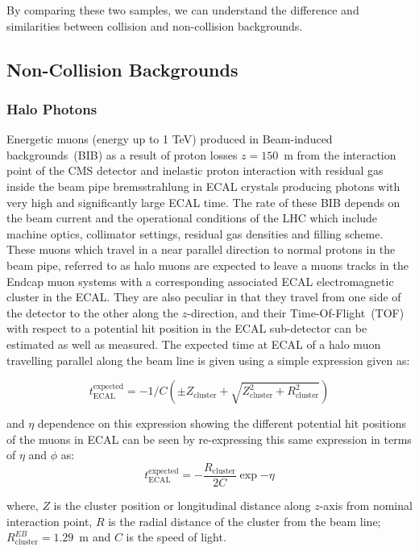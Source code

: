 By comparing these two samples, we can understand the difference and similarities between collision and non-collision backgrounds. 

\subsection{Non-Collision Backgrounds}
\subsubsection{Halo Photons}
Energetic muons (energy up to 1 TeV) produced in Beam-induced backgrounds~(BIB) as a result of proton losses $z = 150$~m from the interaction point of the CMS detector and inelastic proton interaction with residual gas inside the beam pipe bremsstrahlung in ECAL crystals producing photons with very high \pt and significantly large ECAL time. The rate of these BIB depends on the beam current and the operational conditions of the LHC which include machine optics, collimator settings, residual gas densities and filling scheme. These muons which travel in a near parallel direction to normal protons in the beam pipe, referred to as halo muons are expected to leave a muons tracks  in the Endcap muon systems with a corresponding associated ECAL electromagnetic cluster in the ECAL. They are also peculiar in that they travel from one side of the detector to the other along the $z$-direction, and their  Time-Of-Flight~(TOF) with respect to a potential hit position in the ECAL sub-detector can be estimated as well as measured.
The expected time at ECAL of a  halo muon travelling parallel along the beam line is given using a simple expression given as:

\begin{equation}
t^{\mbox{expected}}_{\mbox{ECAL}} = -1/C\left( \pm Z_{\mbox{cluster}} + \sqrt{Z^{2}_{\mbox{cluster}} + R^{2}_{\mbox{cluster}}}  \right)
\end{equation}

and $\eta$ dependence on this expression showing the different potential hit positions of the muons in ECAL can be seen by re-expressing this same expression in terms of $\eta$ and $\phi$ as:
\begin{equation}
t^{\mbox{expected}}_{\mbox{ECAL}} = - \frac{R_{\mbox{cluster}}}{2C} \exp{-\eta}
\end{equation} 

where, $Z$ is the cluster position or longitudinal distance along $z$-axis from nominal interaction point, $R$ is the radial distance of the cluster from the beam line; $R^{EB}_{\mbox{cluster}} = 1.29$~m and $C$ is the speed of light.

